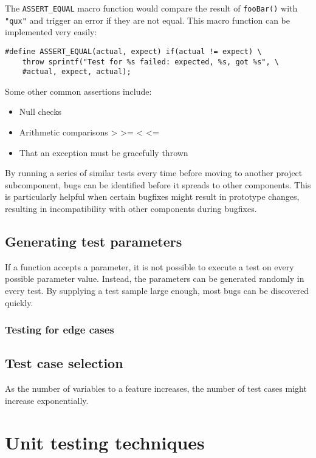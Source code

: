 \documentclass{article}
\begin{document}
The \texttt{ASSERT\_EQUAL} macro function would compare the result of \texttt{fooBar()} with \texttt{"qux"} and trigger an error if they are not equal.
This macro function can be implemented very easily:

\begin{lstlisting}[style=Cpp]
#define ASSERT_EQUAL(actual, expect) if(actual != expect) \
	throw sprintf("Test for %s failed: expected, %s, got %s", \
	#actual, expect, actual);
\end{lstlisting}

Some other common assertions include:
\begin{itemize}
	\item Null checks
	\item Arithmetic comparisons > >= < <=
	\item That an exception must be gracefully thrown
\end{itemize}

By running a series of similar tests every time before moving to another project subcomponent,
bugs can be identified before it spreads to other components.
This is particularly helpful when certain bugfixes might result in prototype changes,
resulting in incompatibility with other components during bugfixes.

\subsection{Generating test parameters}
If a function accepts a parameter, it is not possible to execute a test on every possible parameter value.
Instead, the parameters can be generated randomly in every test.
By supplying a test sample large enough, most bugs can be discovered quickly.


\subsubsection{Testing for edge cases}

\subsection{Test case selection}
As the number of variables to a feature increases, the number of test cases might increase exponentially.

\section{Unit testing techniques}
\end{document}
